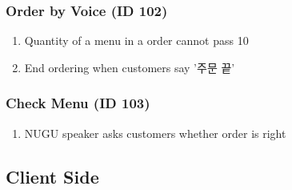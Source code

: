 \documentclass[conference,compsoc]{IEEEtran}
\begin{document}
\subsubsection{Order by Voice (ID 102)}
\begin{enumerate}
  \item Quantity of a menu in a order cannot pass 10
  \item End ordering when customers say '주문 끝'  
\end{enumerate}


\subsubsection{Check Menu (ID 103)}
\begin{enumerate}
  \item NUGU speaker asks customers whether order is right  
\end{enumerate}


\subsection{Client Side}
\end{document}

